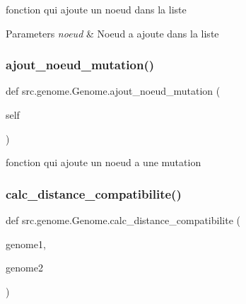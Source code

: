 fonction qui ajoute un noeud dans la liste 


\begin{DoxyParams}{Parameters}
{\em noeud} & Noeud a ajoute dans la liste \\
\hline
\end{DoxyParams}
\mbox{\label{classsrc_1_1genome_1_1_genome_a2d7eb3874592319e992fcaf3de5a2cc3}} 
\subsubsection{\texorpdfstring{ajout\+\_\+noeud\+\_\+mutation()}{ajout\_noeud\_mutation()}}
{\footnotesize\ttfamily def src.\+genome.\+Genome.\+ajout\+\_\+noeud\+\_\+mutation (\begin{DoxyParamCaption}\item[{}]{self }\end{DoxyParamCaption})}



fonction qui ajoute un noeud a une mutation 

\mbox{\label{classsrc_1_1genome_1_1_genome_a09f8ee3a23f65a11fe27d77f24c7add1}} 
\subsubsection{\texorpdfstring{calc\+\_\+distance\+\_\+compatibilite()}{calc\_distance\_compatibilite()}}
{\footnotesize\ttfamily def src.\+genome.\+Genome.\+calc\+\_\+distance\+\_\+compatibilite (\begin{DoxyParamCaption}\item[{}]{genome1,  }\item[{}]{genome2 }\end{DoxyParamCaption})\hspace{0.3cm}{\ttfamily [static]}}



